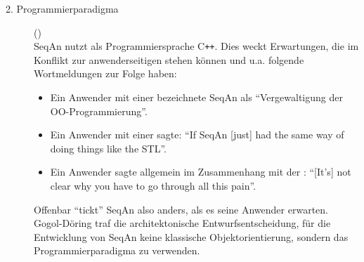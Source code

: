 \begin{description}
  \item[2. Programmierparadigma]\label{sec:lie-oop} () \\ 
  SeqAn nutzt als Programmiersprache C{}\verb!++!. Dies weckt Erwartungen, die im Konflikt zur anwenderseitigen  stehen können und u.a. folgende Wortmeldungen zur Folge haben:
  
  \begin{itemize}
    \item Ein Anwender mit einer  bezeichnete SeqAn als ``Vergewaltigung der OO-Programmierung''.
    \item Ein Anwender mit einer  sagte: ``If SeqAn [just] had the same way of doing things like the STL''.
    \item Ein Anwender sagte allgemein im Zusammenhang mit der : ``[It's] not clear why you have to go through all this pain''.
  \end{itemize}
  
  Offenbar ``tickt'' SeqAn also anders, als es seine Anwender erwarten. Gogol-Döring traf die architektonische Entwurfsentscheidung, für die Entwicklung von SeqAn keine klassische Objektorientierung, sondern das Programmierparadigma  zu verwenden.
  

\end{description}
